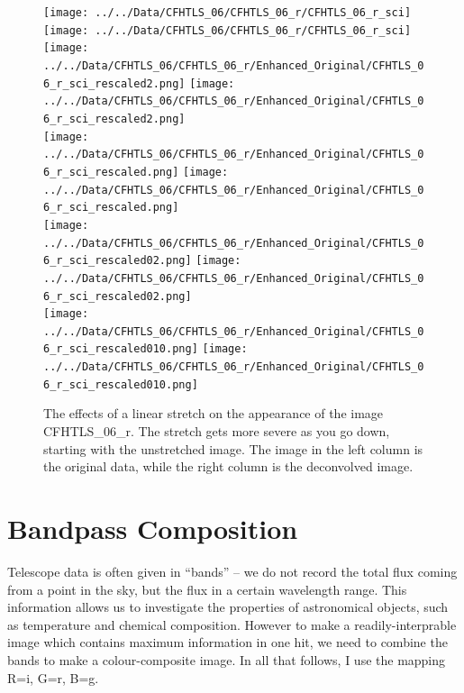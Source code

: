 \documentclass[letterpaper, 11pt]{article}
\begin{document}
\begin{figure}
	\centering
	\def\width{0.15}
	\texttt{[image: ../../Data/CFHTLS\_06/CFHTLS\_06\_r/CFHTLS\_06\_r\_sci]}	
	\texttt{[image: ../../Data/CFHTLS\_06/CFHTLS\_06\_r/CFHTLS\_06\_r\_sci]}\\\vspace{1mm}
	\texttt{[image: ../../Data/CFHTLS\_06/CFHTLS\_06\_r/Enhanced\_Original/CFHTLS\_06\_r\_sci\_rescaled2.png]}
	\texttt{[image: ../../Data/CFHTLS\_06/CFHTLS\_06\_r/Enhanced\_Original/CFHTLS\_06\_r\_sci\_rescaled2.png]}\\\vspace{1mm}
	\texttt{[image: ../../Data/CFHTLS\_06/CFHTLS\_06\_r/Enhanced\_Original/CFHTLS\_06\_r\_sci\_rescaled.png]}
	\texttt{[image: ../../Data/CFHTLS\_06/CFHTLS\_06\_r/Enhanced\_Original/CFHTLS\_06\_r\_sci\_rescaled.png]}\\\vspace{1mm}
	\texttt{[image: ../../Data/CFHTLS\_06/CFHTLS\_06\_r/Enhanced\_Original/CFHTLS\_06\_r\_sci\_rescaled02.png]}
	\texttt{[image: ../../Data/CFHTLS\_06/CFHTLS\_06\_r/Enhanced\_Original/CFHTLS\_06\_r\_sci\_rescaled02.png]}\\\vspace{1mm}
	\texttt{[image: ../../Data/CFHTLS\_06/CFHTLS\_06\_r/Enhanced\_Original/CFHTLS\_06\_r\_sci\_rescaled010.png]}
	\texttt{[image: ../../Data/CFHTLS\_06/CFHTLS\_06\_r/Enhanced\_Original/CFHTLS\_06\_r\_sci\_rescaled010.png]}\\\vspace{1mm}
	\caption{The effects of a linear stretch on the appearance of the image CFHTLS\_06\_r. The stretch gets more severe as you go down, starting with the unstretched image. The image in the left column is the original data, while the right column is the deconvolved image.}
	\label{fig:deconvolution_noise}
\end{figure}



\newpage
\section{Bandpass Composition}
\label{sec:colour}

Telescope data is often given in ``bands'' -- we do not record the total flux coming from a point in the sky, but the flux in a certain wavelength range. This information allows us to investigate the properties of astronomical objects, such as temperature and chemical composition. However to make a readily-interprable image which contains maximum information in one hit, we need to combine the bands to make a colour-composite image. In all that follows, I use the mapping R=i, G=r, B=g.
\end{document}
